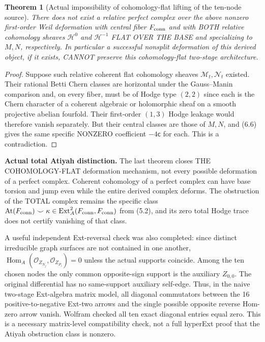 \documentclass[11pt,a4paper]{article}
\newcommand{\Ext}{\operatorname{Ext}}
\newcommand{\Hom}{\operatorname{Hom}}
\newtheorem{theorem}{Theorem}[section]
\begin{document}
\begin{theorem}[Actual impossibility of cohomology-flat lifting of the ten-node source]
There does not exist a relative
perfect complex over the above
nonzero first-order Weil
deformation with central fiber
\(F_{\rm conn}\) and with BOTH
relative cohomology sheaves
\(\mathcal H^{0}\) and
\(\mathcal H^{-1}\) FLAT OVER
THE BASE and specializing
to \(M,N\), respectively.
In particular a successful
nonsplit deformation of this
derived object, if it exists,
CANNOT preserve this
cohomology-flat two-stage
architecture.
\end{theorem}
\begin{proof}
Suppose such relative coherent
flat cohomology sheaves
\(\mathcal M_t,\mathcal N_t\)
existed. Their rational
Betti Chern classes are
horizontal under the
Gauss--Manin comparison and,
on every fiber, must be of
Hodge type \((2,2)\) since
each is the Chern character
of a coherent algebraic
or holomorphic sheaf on a
smooth projective abelian
fourfold. Their first-order
\((1,3)\) Hodge leakage
would therefore vanish
separately. But their
central classes are those
of \(M,N\), and (6.6)
gives the same specific
NONZERO coefficient
\(-4\mathsf c\) for each.
This is a contradiction.
\end{proof}

\noindent\textbf{Actual total Atiyah distinction.}
The last theorem closes
THE COHOMOLOGY-FLAT
deformation mechanism,
not every possible
deformation of a perfect
complex. Coherent cohomology
of a perfect complex can
have base torsion and
jump even while the entire
derived complex deforms.
The obstruction of the
TOTAL complex remains the
specific class
\(
 \mathrm{At}(F_{\rm conn})\smile\kappa
 \in\Ext_A^2(F_{\rm conn},F_{\rm conn})
\)
from (5.2), and its
zero total Hodge trace
does not certify
vanishing of that class.

A useful independent
Ext-reversal check was
also completed: since
distinct irreducible
graph surfaces are not
contained in one another,
\(
 \Hom_A(\mathcal O_{Z_{N_j}},
            \mathcal O_{Z_{P_i}})=0
\)
unless the actual supports
coincide. Among the ten
chosen nodes the only
common opposite-sign support
is the auxiliary \(Z_{0,0}\).
The original differential
has no same-support
auxiliary self-edge.
Thus, in the naive
two-stage Ext-algebra
matrix model, all
diagonal commutators
between the 16
positive-to-negative
Ext-two arrows and
the single possible
opposite reverse
Hom-zero arrow vanish.
Wolfram checked
all ten exact diagonal
entries equal zero.
This is a necessary
matrix-level compatibility
check, not a full
hyperExt proof that the
Atiyah obstruction class
is nonzero.
\end{document}

